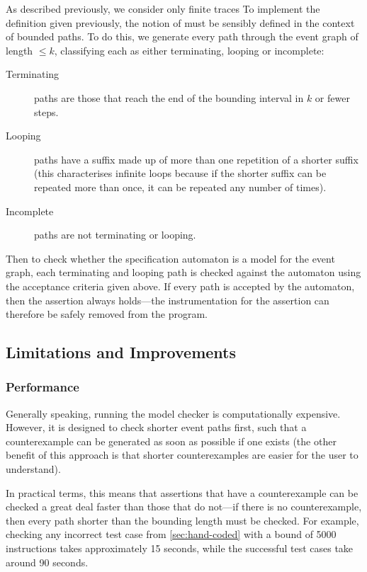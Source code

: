 As described previously, we consider only finite traces To implement the definition given previously, the notion of
 must be sensibly defined in the context of
bounded paths. To do this, we generate every path through the event
graph of length $\leq k$, classifying each as either terminating,
looping or incomplete:
\begin{description}
  \item[Terminating] paths are those that reach the end of the bounding
    interval in $k$ or fewer steps.
  \item[Looping] paths have a suffix made up of more than one
    repetition of a shorter suffix (this characterises infinite loops
    because if the shorter suffix can be repeated more than once, it can
    be repeated any number of times).
  \item[Incomplete] paths are not terminating or looping.
\end{description}

Then to check whether the specification automaton is a model for the
event graph, each terminating and looping path is checked against the
automaton using the acceptance criteria given above. If every path is
accepted by the automaton, then the assertion always holds---the
instrumentation for the assertion can therefore be safely removed from
the program.

\subsection{Limitations and Improvements} \label{sec:model-limits}

\subsubsection{Performance}

Generally speaking, running the model checker is computationally
expensive. However, it is designed to check shorter event paths first,
such that a counterexample can be generated as soon as possible if one
exists (the other benefit of this approach is that shorter
counterexamples are easier for the user to understand).

In practical terms, this means that assertions that have a
counterexample can be checked a great deal faster than those that do
not---if there is no counterexample, then every path shorter than the
bounding length must be checked. For example, checking any incorrect
test case from \autoref{sec:hand-coded} with a bound of 5000
instructions takes approximately 15 seconds, while the successful test
cases take around 90 seconds.

